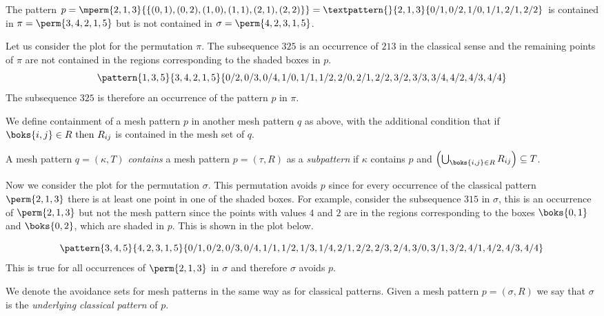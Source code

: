 \begin{example}
    The pattern \(p=\mperm{2,1,3}{\{(0,1),(0,2),(1,0),(1,1),(2,1),(2,2)\}}=
    \textpattern{}{ 2, 1, 3 }{ 0/1, 0/2, 1/0, 1/1, 2/1, 2/2 }\) is contained in
    \(\pi = \perm{3,4,2,1,5}\) but is not contained in \(\sigma = \perm{4,2,3,1,5}\).
\end{example}

Let us consider the plot for the permutation \(\pi\). The subsequence \(325\) is
an occurrence of \(213\) in the classical sense and the remaining points of \(\pi\)
are not contained in the regions corresponding to the shaded boxes in \(p\).
\begin{equation*}
    \pattern{1,3,5}{3,4,2,1,5}{0/2,0/3,0/4,
                               1/0,1/1,1/2,
                               2/0,2/1,2/2,
                               3/2,3/3,3/4,
                               4/2,4/3,4/4}
\end{equation*}
The subsequence \(325\) is therefore an occurrence of the pattern \(p\) in \(\pi\).

We define containment of a mesh pattern \(p\) in another mesh pattern \(q\) as above,
with the additional condition that if \(\boks{i,j}\in R\text{ then } R_{ij}\) is
contained in the mesh set of \(q\).

\begin{definition}
A mesh pattern \(q=(\kappa,T)\) \emph{contains} a mesh pattern \(p=(\tau,R)\) as a \emph{subpattern}
if \(\kappa\) contains \(p\) and \(\left(\bigcup_{\boks{i,j}\in R} R_{ij}\right)\subseteq T\).
\end{definition}


Now we consider the plot for the permutation \(\sigma\). This permutation
avoids \(p\) since for every occurrence of the classical pattern \(\perm{2,1,3}\)
there is at least one point in one of the shaded boxes. For example, consider the
subsequence \(315\) in \(\sigma\), this is an occurrence of \(\perm{2,1,3}\) but
not the mesh pattern since the points with values \(4\) and \(2\) are in the
regions corresponding to the boxes \(\boks{0,1}\) and \(\boks{0,2}\), which are shaded in
\(p\). This is shown in the plot below.

\begin{equation*}
    \pattern{3,4,5}{4,2,3,1,5}{0/1,0/2,0/3,0/4,
                               1/1,1/2,1/3,1/4,
                               2/1,2/2,2/3,2/4,
                               3/0,3/1,3/2,
                               4/1,4/2,4/3,4/4}
\end{equation*}
This is true for all occurrences of \(\perm{2,1,3}\) in \(\sigma\) and
therefore \(\sigma\) avoids \(p\).

We denote the avoidance sets for mesh patterns in the same way as for
classical patterns. Given a mesh pattern \(p=(\sigma,R)\) we say that \(\sigma\) is the \emph{underlying
classical pattern} of \(p\).
